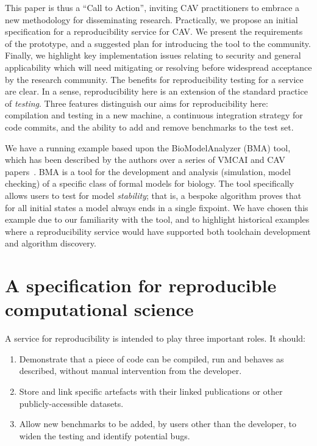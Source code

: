 \documentclass{llncs}
\begin{document}
This paper is thus a ``Call to Action'', inviting CAV practitioners to
embrace a new methodology for disseminating research. Practically, we
propose an initial specification for a reproducibility service for CAV. We
present the requirements of the prototype, and a suggested plan for
introducing the tool to the community. Finally, we highlight key
implementation issues relating to security and general applicability
which will need mitigating or resolving before widespread acceptance
by the research community.  The benefits for reproducibility testing
for a service are clear. In a sense, reproducibility here is an
extension of the standard practice of \emph{testing}.  Three features
distinguish our aims for reproducibility here: compilation and testing
in a new machine, a continuous integration strategy for code commits,
and the ability to add and remove benchmarks to the test set.

We have a running example based upon the BioModelAnalyzer (BMA) tool,
which has been described by the authors over a series of VMCAI and CAV
papers~\cite{cook-et-al:2011,benque-et-al:2012,cook-et-al:2014}.  BMA
is a tool for the development and analysis (simulation, model
checking) of a specific class of formal models for biology. The tool
specifically allows users to test for model \emph{stability}; that is,
a bespoke algorithm proves that for all initial states a model always
ends in a single fixpoint. We have chosen this example due to our
familiarity with the tool, and to highlight historical examples where
a reproducibility service would have supported both toolchain
development and algorithm discovery.



\section{A specification for reproducible computational science}\label{spec}

A service for reproducibility is intended to play three important
roles. It should:

\begin{enumerate}
	\item Demonstrate that a piece of code can be compiled, run and behaves as described,
		without manual intervention from the developer.
	\item Store and link specific artefacts with their linked publications
		or other publicly-accessible datasets.
	\item Allow new benchmarks to be added, by users other than the developer, to 
		widen the testing and identify potential bugs.
\end{enumerate}
\end{document}
